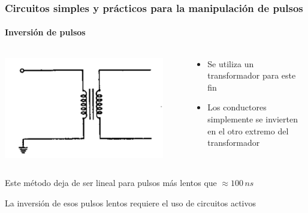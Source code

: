 \documentclass{beamer}
\begin{document}
\begin{frame}
\frametitle{Circuitos simples y prácticos para la manipulación de
pulsos}
\framesubtitle{{\color{blue}Inversión de pulsos}}
\begin{columns}
\begin{column}{0.5\textwidth}
\begin{center}
\includegraphics[width=0.9\textwidth]{d2/pulse_inverter}
\end{center}
\end{column}
\begin{column}{0.45\textwidth}
\begin{alertblock}{}
\begin{itemize}
\item Se utiliza un transformador para este fin
\item Los conductores simplemente se invierten en el otro extremo del 
transformador
\end{itemize}
\end{alertblock}
\end{column}
\end{columns}
Este método deja de ser lineal para pulsos más lentos que $\approx 100\,ns$

La inversión de esos pulsos lentos requiere el uso de circuitos activos
\end{frame}
\end{document}
